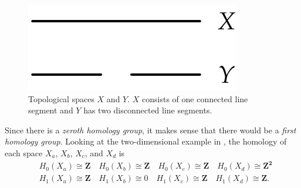 \begin{figure}[h]
	\begin{center}
		\includegraphics[width=0.3\columnwidth]{Figs/homology1d.pdf}
		\caption{\label{fig:homology1d} Topological spaces $X$ and $Y$. $X$ consists of one connected line segment and $Y$ has two disconnected line segments.}
	\end{center}
\end{figure}

Since there is a \textit{zeroth homology group}, it makes sense that there would be a \textit{first homology group}. Looking at the two-dimensional example in , the homology of each space $X_a$, $X_b$, $X_c$, and $X_d$ is
%
\begin{align}
	& H_0(X_a) \cong \mathbf{Z} \quad H_0(X_b) \cong \mathbf{Z} \quad H_0(X_c) \cong \mathbf{Z} \quad H_0(X_d) \cong \mathbf{Z^2} \\
	& H_1(X_a) \cong  \mathbf{Z} \quad H_1(X_b) \cong 0 \quad H_1(X_c) \cong \mathbf{Z} \quad H_1(X_d) \cong \mathbf{Z}.
	 \label{eq:homology2d} 
\end{align}

